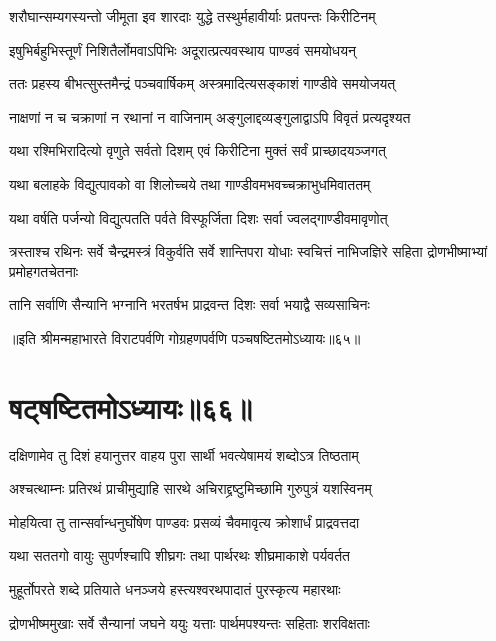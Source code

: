 \twolineshloka
{शरौघान्सम्यगस्यन्तो जीमूता इव शारदाः}
{युद्धे तस्थुर्महावीर्याः प्रतपन्तः किरीटिनम्}


\twolineshloka
{इषुभिर्बहुभिस्तूर्णं निशितैर्लोमवाऽपिभिः}
{अदूरात्प्रत्यवस्थाय पाण्डवं समयोधयन्}


\twolineshloka
{ततः प्रहस्य बीभत्सुस्तमैन्द्रं पञ्चवार्षिकम्}
{अस्त्रमादित्यसङ्काशं गाण्डीवे समयोजयत्}


\twolineshloka
{नाक्षणां न च चक्राणां न रथानां न वाजिनाम्}
{अङ्गुलाद्दव्यङ्गुलाद्वाऽपि विवृतं प्रत्यदृश्यत}


\twolineshloka
{यथा रश्मिभिरादित्यो वृणुते सर्वतो दिशम्}
{एवं किरीटिना मुक्तं सर्वं प्राच्छादयञ्जगत्}


\twolineshloka
{यथा बलाहके विद्युत्पावको वा शिलोच्चये}
{तथा गाण्डीवमभवच्चक्राभुधमिवाततम्}


\twolineshloka
{यथा वर्षति पर्जन्यो विद्युत्पतति पर्वते}
{विस्फूर्जिता दिशः सर्वा ज्वलद्गाण्डीवमावृणोत्}


\threelineshloka
{त्रस्ताश्च रथिनः सर्वे चैन्द्रमस्त्रं विकुर्वति}
{सर्वे शान्तिपरा योधाः स्वचित्तं नाभिजज्ञिरे}
{सहिता द्रोणभीष्माभ्यां प्रमोहगतचेतनाः}


\twolineshloka
{तानि सर्वाणि सैन्यानि भग्नानि भरतर्षभ}
{प्राद्रवन्त दिशः सर्वा भयाद्वै सव्यसाचिनः}

॥इति श्रीमन्महाभारते विराटपर्वणि गोग्रहणपर्वणि पञ्चषष्टितमोऽध्यायः॥६५॥

\chapter{षट्षष्टितमोऽध्यायः॥६६॥}

\twolineshloka
{दक्षिणामेव तु दिशं हयानुत्तर वाहय}
{पुरा सार्थी भवत्येषामयं शब्दोऽत्र तिष्ठताम्}


\twolineshloka
{अश्चत्थाम्नः प्रतिरथं प्राचीमुद्याहि सारथे}
{अचिराद्द्रष्टुमिच्छामि गुरुपुत्रं यशस्विनम्}



\twolineshloka
{मोहयित्वा तु तान्सर्वान्धनुर्घोषेण पाण्डवः}
{प्रसव्यं चैवमावृत्य क्रोशार्धं प्राद्रवत्तदा}


\twolineshloka
{यथा सततगो वायुः सुपर्णश्चापि शीघ्रगः}
{तथा पार्थरथः शीघ्रमाकाशे पर्यवर्तत}


\twolineshloka
{मुहूर्तोपरते शब्दे प्रतियाते धनञ्जये}
{हस्त्यश्वरथपादातं पुरस्कृत्य महारथाः}


\twolineshloka
{द्रोणभीष्ममुखाः सर्वे सैन्यानां जघने ययुः}
{यत्ताः पार्थमपश्यन्तः सहिताः शरविक्षताः}

